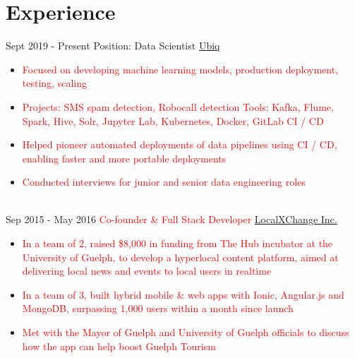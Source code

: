 \documentclass[letterpaper]{twentysecondcv} %
\begin{document}
\makeprofile %
 

\section{Experience}

\begin{twenty} %
\twentyitem
    	{Sept 2019 -}
		{Present}
        {Position: Data Scientist}
        {\href{http://www.ubiq.ai/}{Ubiq}}
        {}
        {\begin{itemize}
        \item \textcolor{red}{Focused on developing machine learning models, production deployment, testing, scaling}
        \item \textcolor{red}{Projects: SMS spam detection, Robocall detection} 
        \textcolor{red}{Tools: Kafka, Flume, Spark, Hive, Solr, Jupyter Lab, Kubernetes, Docker, GitLab CI / CD}
        \item \textcolor{red}{Helped pioneer automated deployments of data pipelines using CI / CD, enabling faster and more portable deployments}
        \item \textcolor{red}{Conducted interviews for junior and senior data engineering roles}
        \end{itemize}}
        \\
	\twentyitem
    	{Sep 2015 -}
		{May 2016}
        {\textcolor{red}{Co-founder \& Full Stack Developer}}
        {\href{http://www.localxchange.ca/}{LocalXChange Inc.}}
        {}
        {
        {\begin{itemize}
        \item \textcolor{red}{In a team of 2, raised \$8,000 in funding from The Hub incubator at the University of Guelph, to develop a hyperlocal content platform, aimed at delivering local news and events to local users in realtime}
        \item \textcolor{red}{In a team of 3, built hybrid mobile \& web apps with Ionic, Angular.js and MongoDB, surpassing 1,000 users within a month since launch}
        \item \textcolor{red}{Met with the Mayor of Guelph and University of Guelph officials to discuss how the app can help boost Guelph Tourism} 
    \end{itemize}}
}
\end{twenty}
\end{document}
